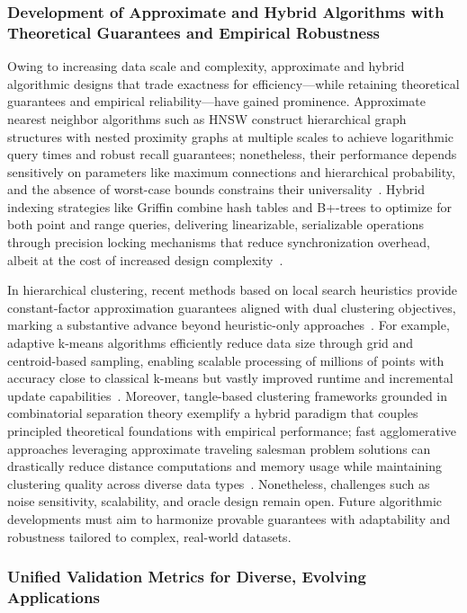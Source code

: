 \documentclass[sigconf]{acmart}
\begin{document}
\subsubsection{Development of Approximate and Hybrid Algorithms with Theoretical Guarantees and Empirical Robustness}

Owing to increasing data scale and complexity, approximate and hybrid algorithmic designs that trade exactness for efficiency—while retaining theoretical guarantees and empirical reliability—have gained prominence. Approximate nearest neighbor algorithms such as HNSW construct hierarchical graph structures with nested proximity graphs at multiple scales to achieve logarithmic query times and robust recall guarantees; nonetheless, their performance depends sensitively on parameters like maximum connections and hierarchical probability, and the absence of worst-case bounds constrains their universality~\cite{ref4}. Hybrid indexing strategies like Griffin combine hash tables and B+-trees to optimize for both point and range queries, delivering linearizable, serializable operations through precision locking mechanisms that reduce synchronization overhead, albeit at the cost of increased design complexity~\cite{ref35}.

In hierarchical clustering, recent methods based on local search heuristics provide constant-factor approximation guarantees aligned with dual clustering objectives, marking a substantive advance beyond heuristic-only approaches~\cite{ref20}. For example, adaptive k-means algorithms efficiently reduce data size through grid and centroid-based sampling, enabling scalable processing of millions of points with accuracy close to classical k-means but vastly improved runtime and incremental update capabilities~\cite{ref20}. Moreover, tangle-based clustering frameworks grounded in combinatorial separation theory exemplify a hybrid paradigm that couples principled theoretical foundations with empirical performance; fast agglomerative approaches leveraging approximate traveling salesman problem solutions can drastically reduce distance computations and memory usage while maintaining clustering quality across diverse data types~\cite{ref21}. Nonetheless, challenges such as noise sensitivity, scalability, and oracle design remain open. Future algorithmic developments must aim to harmonize provable guarantees with adaptability and robustness tailored to complex, real-world datasets.

\subsubsection{Unified Validation Metrics for Diverse, Evolving Applications}
\end{document}

